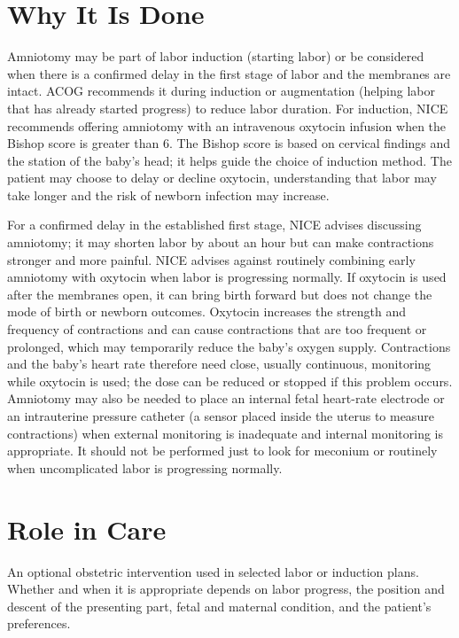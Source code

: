 \section*{Why It Is Done}
Amniotomy may be part of labor induction (starting labor) or be considered when there is a confirmed delay in the first stage of labor and the membranes are intact. ACOG recommends it during induction or augmentation (helping labor that has already started progress) to reduce labor duration. For induction, NICE recommends offering amniotomy with an intravenous oxytocin infusion when the Bishop score is greater than 6. The Bishop score is based on cervical findings and the station of the baby's head; it helps guide the choice of induction method. The patient may choose to delay or decline oxytocin, understanding that labor may take longer and the risk of newborn infection may increase.

For a confirmed delay in the established first stage, NICE advises discussing amniotomy; it may shorten labor by about an hour but can make contractions stronger and more painful. NICE advises against routinely combining early amniotomy with oxytocin when labor is progressing normally. If oxytocin is used after the membranes open, it can bring birth forward but does not change the mode of birth or newborn outcomes. Oxytocin increases the strength and frequency of contractions and can cause contractions that are too frequent or prolonged, which may temporarily reduce the baby's oxygen supply. Contractions and the baby's heart rate therefore need close, usually continuous, monitoring while oxytocin is used; the dose can be reduced or stopped if this problem occurs. Amniotomy may also be needed to place an internal fetal heart-rate electrode or an intrauterine pressure catheter (a sensor placed inside the uterus to measure contractions) when external monitoring is inadequate and internal monitoring is appropriate. It should not be performed just to look for meconium or routinely when uncomplicated labor is progressing normally.

\section*{Role in Care}
An optional obstetric intervention used in selected labor or induction plans. Whether and when it is appropriate depends on labor progress, the position and descent of the presenting part, fetal and maternal condition, and the patient's preferences.

